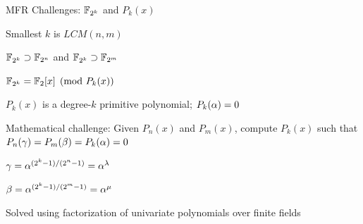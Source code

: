 
\begin{frame}{\large MFR Challenges: ${\mathbb{F}}_{2^k}$ and $P_k(x)$}
\bi
	\item Smallest $k$ is $LCM(n,m)$
	\bi
		\item ${\mathbb{F}}_{2^k} \supset {\mathbb{F}}_{2^n}$ and ${\mathbb{F}}_{2^k} \supset {\mathbb{F}}_{2^m}$
		\item ${\mathbb{F}}_{2^k} = {\mathbb{F}}_{2}[x]\pmod{P_k(x)}$
		\bi
			\item $P_k(x)$ is a degree-$k$ primitive polynomial; $P_k(\alpha) =0$ 
		\ei
	\ei
	\pause
	\vspace{0.1in}
	\item  Mathematical challenge: Given $P_n(x)$ and $P_m(x)$, compute $P_k(x)$ such that
	$P_n(\gamma)= P_m(\beta)=P_k(\alpha)=0$
	\vspace{0.1in}
	\bi
		\item $\gamma = \alpha^{(2^k-1)/(2^n-1)} = \alpha^{\lambda}$
		\item $\beta = \alpha^{(2^k-1)/(2^m-1)} = \alpha^{\mu}$
	\ei
	\pause
	\vspace{0.1in}
	\item Solved using factorization of univariate polynomials over finite fields
\ei

\end{frame}


